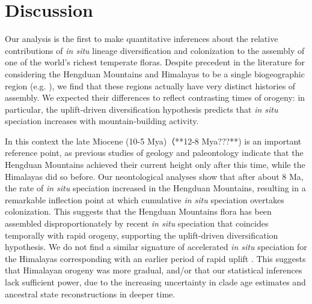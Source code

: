 \section{Discussion}

Our analysis is the first to make quantitative inferences about the relative contributions of \textit{in situ} lineage diversification and colonization to the assembly of one of the world's richest temperate floras. Despite precedent in the literature for considering the Hengduan Mountains and Himalayas to be a single biogeographic region (e.g. \citealt{Zhang2014,Nie2013,GaoY2013,Matuszak2016}), we find that these regions actually have very distinct histories of assembly. We expected their differences to reflect contrasting times of orogeny: in particular, the uplift-driven diversification hypothesis predicts that \textit{in situ} speciation increases with mountain-building activity.

In this context the late Miocene (10-5 Mya)（**12-8 Mya???**) is an important reference point, as previous studies of geology and paleontology indicate that the Hengduan Mountains achieved their current height only after this time, while the Himalayas did so before. Our neontological analyses show that after about 8 Ma, the rate of \textit{in situ} speciation increased in the Hengduan Mountains, resulting in a remarkable inflection point at which cumulative \textit{in situ} speciation overtakes colonization. This suggests that the Hengduan Mountains flora has been assembled disproportionately by recent \textit{in situ} speciation that coincides temporally with rapid orogeny, supporting the uplift-driven diversification hypothesis. We do not find a similar signature of accelerated \textit{in situ} speciation for the Himalayas corresponding with an earlier period of rapid uplift \citep{WangY2007,Mao2010}. This suggests that Himalayan orogeny was more gradual, and/or that our statistical inferences lack sufficient power, due to the increasing uncertainty in clade age estimates and ancestral state reconstructions in deeper time. %

